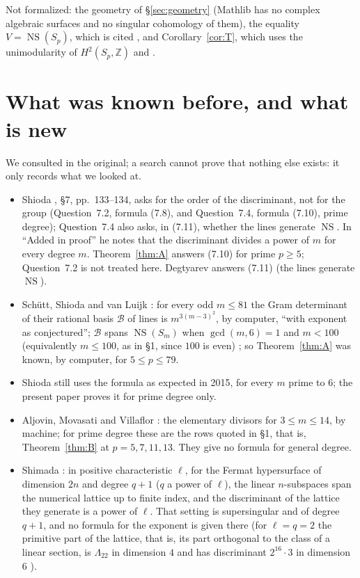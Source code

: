 \documentclass[11pt]{article}
\theoremstyle{definition}
\theoremstyle{remark}
\newcommand{\Z}{\mathbb{Z}}
\newcommand{\NS}{\operatorname{NS}}
\begin{document}
Not formalized: the geometry of \S\ref{sec:geometry} (Mathlib has no complex algebraic surfaces and no singular cohomology of them), the equality $V=\NS(S_p)$, which is cited \cite{SSvL,Deg}, and Corollary~\ref{cor:T}, which uses the unimodularity of $H^2(S_p,\Z)$ and \cite{Nik}.

\section{What was known before, and what is new}\label{sec:history}

We consulted \cite{Sh87,SSvL,Deg,DS,Sh15,AMV,Shi01,ST10} in the original; a search cannot prove that nothing else exists: it only records what we looked at.
\begin{itemize}
\item Shioda \cite{Sh87}, \S7, pp.~133--134, asks for the order of the discriminant, not for the group (Question~7.2, formula (7.8), and Question~7.4, formula (7.10), prime degree); Question~7.4 also asks, in (7.11), whether the lines generate $\NS$. In ``Added in proof'' he notes that the discriminant divides a power of $m$ for every degree $m$. Theorem~\ref{thm:A} answers (7.10) for prime $p\ge5$; Question~7.2 is not treated here. Degtyarev \cite{Deg} answers (7.11) (the lines generate $\NS$).
\item Sch\"utt, Shioda and van Luijk \cite[end of \S4]{SSvL}: for every odd $m\le81$ the Gram determinant of their rational basis $\mathcal B$ of lines is $m^{3(m-3)^2}$, by computer, ``with exponent as conjectured''; $\mathcal B$ spans $\NS(S_m)$ when $\gcd(m,6)=1$ and $m<100$ (equivalently $m\le100$, as in \S1, since $100$ is even) \cite[Remark~4.5 and the proof of Theorem~1.1]{SSvL}; so Theorem~\ref{thm:A} was known, by computer, for $5\le p\le79$.
\item Shioda \cite[\S6.5, Conjecture~23]{Sh15} still uses the formula as expected in 2015, for every $m$ prime to $6$; the present paper proves it for prime degree only.
\item Aljovin, Movasati and Villaflor \cite[Table~1]{AMV}: the elementary divisors for $3\le m\le14$, by machine; for prime degree these are the rows quoted in \S1, that is, Theorem~\ref{thm:B} at $p=5,7,11,13$. They give no formula for general degree.
\item Shimada \cite[Theorem~1.1]{Shi01}: in positive characteristic $\ell$, for the Fermat hypersurface of dimension $2n$ and degree $q+1$ ($q$ a power of $\ell$), the linear $n$-subspaces span the numerical lattice up to finite index, and the discriminant of the lattice they generate is a power of $\ell$. That setting is supersingular and of degree $q+1$, and no formula for the exponent is given there (for $\ell=q=2$ the primitive part of the lattice, that is, its part orthogonal to the class of a linear section, is $\Lambda_{22}$ in dimension $4$ and has discriminant $2^{16}\cdot3$ in dimension $6$ \cite[Theorems~1.5 and~1.6]{Shi01}).
\end{itemize}
\end{document}
